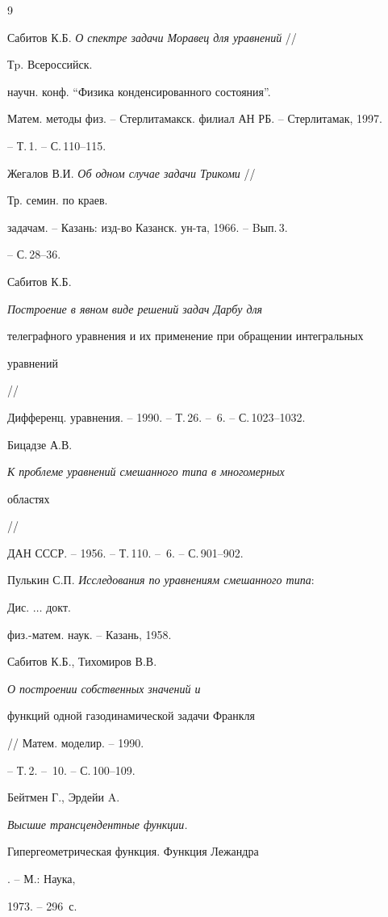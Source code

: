 \begin{thebibliography}{9}







Сабитов К.Б. {\em О спектре задачи Моравец для уравнений} //


Тp. Всероссийск.


научн. конф. ``Физика конденсированного состояния''.


Матем. методы физ. -- Стерлитамакск. филиал АН РБ. -- Стерлитамак, 1997.


-- Т.\,1. -- С.\,110--115.




Жегалов В.И. {\em Об одном случае задачи Трикоми} //


Тр. семин. по краев.


задачам. -- Казань: изд-во Казанск. ун-та, 1966. -- Bып.\,3.


-- С.\,28--36.




Сабитов К.Б. {\em Построение в явном виде решений задач Дарбу для


телеграфного уравнения и их применение при обращении интегральных


уравнений} //


Дифференц. уравнения. -- 1990. -- Т.\,26. -- \No\,6. -- С.\,1023--1032.




Бицадзе А.В. {\em К проблеме уравнений смешанного типа в многомерных


областях} //


ДАН СССР. -- 1956. -- Т.\,110. -- \No\,6. -- С.\,901--902.




Пулькин С.П. {\em Исследования по уравнениям смешанного типа}:


Дис. $\dotsc$ докт.


физ.-матем. наук. -- Казань, 1958.




Сабитов К.Б., Тихомиров В.В. {\em О построении собственных значений и


функций одной газодинамической задачи Франкля} // Матем. моделир. -- 1990.


-- Т.\,2. -- \No\,10. -- С.\,100--109.




Бейтмен Г., Эрдейи A. {\em Высшие трансцендентные функции.


Гипергеометрическая функция. Функция Лежандра}. --  М.: Наука,


1973. -- 296~с.





\end{thebibliography}





